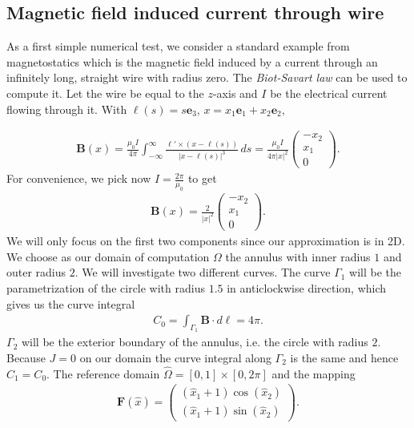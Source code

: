 \documentclass[../master_thesis.tex]{subfiles}
\begin{document}
\subsection{Magnetic field induced current through wire}
As a first simple numerical test, we consider a standard example from 
magnetostatics which is the magnetic field induced by a current through an infinitely long, 
straight wire with radius zero. The \textit{Biot-Savart law} can be used to compute it. 
Let the wire be equal to the $z$-axis and $I$ be the electrical current 
flowing through it. With $\bm{\ell}(s) = s \mathbf{e}_3$, $x = x_1 \mathbf{e}_1 +  x_2 \mathbf{e}_2$,

\begin{align*}
    \mathbf{B}(x) = \frac{\mu_0 I}{4\pi} \int_{-\infty}^\infty  
        \frac{\ell' \times (x - \ell(s))}{|x - \ell(s)|^3} \, ds
    = \frac{\mu_0 I}{4\pi |x|^2}  \begin{pmatrix}-x_2 \\ x_1 \\ 0 \end{pmatrix}.
\end{align*}
For convenience, we pick now $I = \frac{2 \pi}{\mu_0}$ to get 
\begin{align*}
    \mathbf{B}(x) = \frac{2}{|x|^2} \begin{pmatrix}-x_2 \\ x_1 \\ 0 \end{pmatrix}.
\end{align*}
We will only focus on the first two components since our approximation is in 2D.
We choose as our domain of computation $\Omega$ the annulus with 
inner radius $1$ and outer radius $2$. 
We will investigate two different curves. 
The curve $\Gamma_1$ will be the parametrization of the circle with radius 
$1.5$ in anticlockwise direction, which gives us the curve integral 
\begin{align*}
    C_0 = \int_{\Gamma_1} \mathbf{B}\cdot d\ell = 4\pi.
\end{align*}
$\Gamma_2$ will be the exterior boundary of the annulus, i.e. the circle 
with radius $2$. Because 
$J= 0$ on our domain the curve integral along $\Gamma_2$ is the same and hence $C_1 = C_0$. 
The reference domain $\hat{\Omega} = [0,1] \times [0, 2\pi]$ and the mapping 
\begin{align*}
    \mathbf{F}(\hat{x}) = \begin{pmatrix}
            (\hat{x}_1 + 1)\cos(\hat{x}_2 ) 
            \\ (\hat{x}_1 + 1)\sin(\hat{x}_2 ) 
    \end{pmatrix}.
\end{align*}
\end{document}
